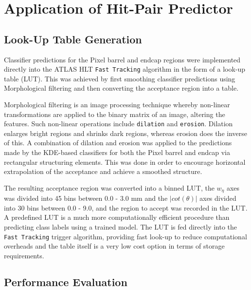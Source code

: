 \section{Application of Hit-Pair Predictor}
\label{application-of-hit-pair-predictor}

\subsection{Look-Up Table Generation}

Classifier predictions for the Pixel barrel and endcap regions were implemented directly into the ATLAS HLT \texttt{Fast Tracking} algorithm in the form of a look-up table (LUT). This was achieved by first smoothing classifier predictions using Morphological filtering \cite{morphological-filtering} and then converting the acceptance region into a table.

Morphological filtering is an image processing technique whereby non-linear transformations are applied to the binary matrix of an image, altering the features. Such non-linear operations include \texttt{dilation} and \texttt{erosion}. Dilation enlarges bright regions and shrinks dark regions, whereas erosion does the inverse of this. A combination of dilation and erosion was applied to the predictions made by the KDE-based classifiers for both the Pixel barrel and endcap via rectangular structuring elements. This was done in order to encourage horizontal extrapolation of the acceptance and achieve a smoothed structure. 

The resulting acceptance region was converted into a binned LUT, the $w_{\eta}$ axes was divided into 45 bins between 0.0 - 3.0 mm and the $\lvert cot(\theta) \rvert$ axes divided into 30 bins between 0.0 - 9.0, and the region to accept was recorded in the LUT. A predefined LUT is a much more computationally efficient procedure than predicting class labels using a trained model. The LUT is fed directly into the \texttt{Fast Tracking} trigger algorithm, providing fast look-up to reduce computational overheads and the table itself is a very low cost option in terms of storage requirements. 







\subsection{Performance Evaluation}

